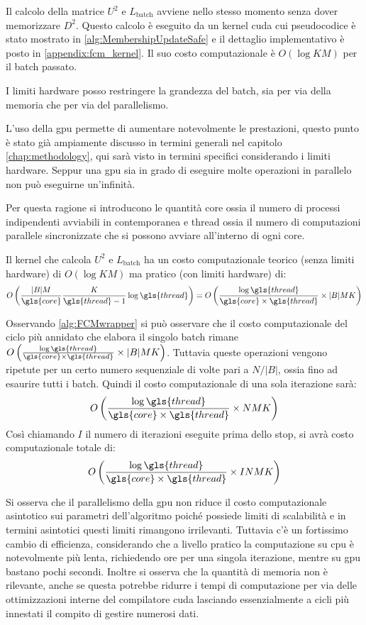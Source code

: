 \begin{toDo}
	\noindent Il calcolo della matrice $U^2$ e $L_\text{batch}$ avviene nello stesso momento senza dover memorizzare $D^2$. Questo calcolo è eseguito da un kernel \gls{cuda} cui pseudocodice è stato mostrato in \cref{alg:MembershipUpdateSafe} e il dettaglio implementativo è posto in \cref{appendix:fcm_kernel}. Il suo costo computazionale è $O(\log KM)$ per il batch passato.

	\bigskip\noindent I limiti hardware posso restringere la grandezza del batch, sia per via della memoria che per via del parallelismo.

	\noindent L'uso della \gls{gpu} permette di aumentare notevolmente le prestazioni, questo punto è stato già ampiamente discusso in termini generali nel capitolo \cref{chap:methodology}, qui sarà visto in termini specifici considerando i limiti hardware. Seppur una \gls{gpu} sia in grado di eseguire molte operazioni in parallelo non può eseguirne un'infinità.

	\noindent Per questa ragione si introducono le quantità \gls{core} ossia il numero di processi indipendenti avviabili in contemporanea e \gls{thread} ossia il numero di computazioni parallele sincronizzate che si possono avviare all'interno di ogni \gls{core}.

	\noindent Il kernel che calcola $U^2$ e $L_\text{batch}$ ha un costo computazionale teorico (senza limiti hardware) di $O(\log KM)$ ma pratico (con limiti hardware) di:
	\[
		O\left(\frac{|B|M}{\gls{core}}\frac{K}{\gls{thread}-1}\log\gls{thread}\right) = O\left(\frac{\log\gls{thread}}{\gls{core}\times\gls{thread}}\times|B|MK\right)
	\]

	\noindent Osservando \cref{alg:FCMwrapper} si può osservare che il costo computazionale del ciclo più annidato che elabora il singolo batch rimane $O\left(\frac{\log\gls{thread}}{\gls{core}\times\gls{thread}}\times|B|MK\right)$. Tuttavia queste operazioni vengono ripetute per un certo numero sequenziale di volte pari a $N/|B|$, ossia fino ad esaurire tutti i batch. Quindi il costo computazionale di una sola iterazione sarà:
	\[
		O\left(\frac{\log\gls{thread}}{\gls{core}\times\gls{thread}}\times NMK\right)
	\]
	Così chiamando $I$ il numero di iterazioni eseguite prima dello stop, si avrà costo computazionale totale di:
	\[
		O\left(\frac{\log\gls{thread}}{\gls{core}\times\gls{thread}}\times INMK\right)
	\]

	\noindent Si osserva che il parallelismo della \gls{gpu} non riduce il costo computazionale asintotico sui parametri dell'algoritmo poiché possiede limiti di scalabilità e in termini asintotici questi limiti rimangono irrilevanti. Tuttavia c'è un fortissimo cambio di efficienza, considerando che a livello pratico la computazione su \gls{cpu} è notevolmente più lenta, richiedendo ore per una singola iterazione, mentre su \gls{gpu} bastano pochi secondi. Inoltre si osserva che la quantità di memoria non è rilevante, anche se questa potrebbe ridurre i tempi di computazione per via delle ottimizzazioni interne del compilatore \gls{cuda} lasciando essenzialmente a cicli più innestati il compito di gestire numerosi dati.


\end{toDo}
